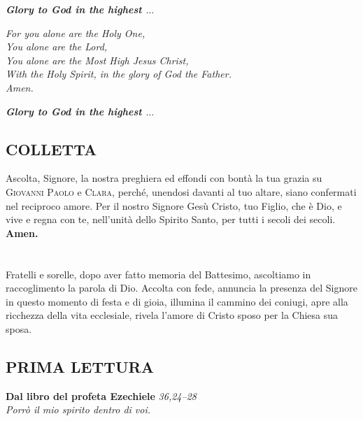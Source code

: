 \documentclass[10pt,b6paper,usenames,twoside]{article}
\begin{document}
\hfill\begin{minipage}{\dimexpr\textwidth-1cm}
\textbf{\textit{Glory to God in the highest $\hdots$}}\\
\end{minipage}

\noindent \textit{For you alone are the Holy One,\\
You alone are the Lord,\\
You alone are the Most High Jesus Christ,\\
With the Holy Spirit, in the glory of God the Father.\\ 
Amen.}\\

\hfill\begin{minipage}{\dimexpr\textwidth-1cm}
\textbf{\textit{Glory to God in the highest $\hdots$}}\\
\end{minipage}

\subsection*{\textcolor{forestgreen(traditional)}{COLLETTA}} 
\noindent Ascolta, Signore, la nostra preghiera ed effondi con bontà la tua grazia su \textcolor{forestgreen(traditional)}{\textsc{Giovanni Paolo}} e \textcolor{forestgreen(traditional)}{\textsc{Clara}}, perché, unendosi davanti al tuo altare, siano confermati nel reciproco amore. Per il nostro Signore Gesù Cristo, tuo Figlio, che è Dio, e vive e regna con te, nell'unità dello Spirito Santo, per tutti i secoli dei secoli.\\ \textbf{Amen.} 
\clearpage

\section*{\textcolor{forestgreen(traditional)}{}}
\noindent Fratelli e sorelle, dopo aver fatto memoria del Battesimo, ascoltiamo in raccoglimento la parola di Dio. Accolta con fede, annuncia la presenza del Signore in questo momento di festa e di gioia, illumina il cammino dei coniugi, apre alla ricchezza della vita ecclesiale, rivela l'amore di Cristo sposo per la Chiesa sua sposa.
 
\subsection*{\textcolor{forestgreen(traditional)}{PRIMA LETTURA}} 
\noindent \textbf{Dal libro del profeta Ezechiele} \hfill \textcolor{forestgreen(traditional)}{\textit{36,24--28}}\\ 
\textcolor{forestgreen(traditional)}{\textit{\footnotesize{Porrò il mio spirito dentro di voi.}}}\\ 
\end{document}
